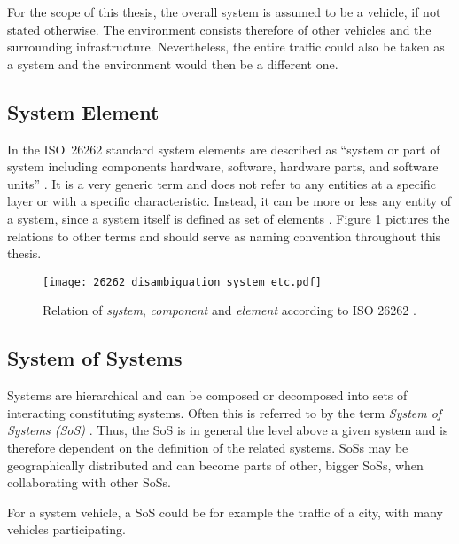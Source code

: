 For the scope of this thesis, the overall system is assumed to be a vehicle, if not stated otherwise. The environment consists therefore of other vehicles and the surrounding infrastructure. Nevertheless, the entire traffic could also be taken as a system and the environment would then be a different one.



\subsection{System Element}
\label{sec:system_element}
In the \mbox{ISO 26262} standard system elements are described as ``system or part of system including components hardware, software, hardware parts, and software units'' \cite{iso26262:1}. It is a very generic term and does not refer to any entities at a specific layer or with a specific characteristic. Instead, it can be more or less any entity of a system, since a system itself is defined as set of elements \cite{iso26262:1}. Figure \ref{fig:26262_disambiguation} pictures the relations to other terms and should serve as naming convention throughout this thesis.

\begin{figure}[!htbp]
\centering
\texttt{[image: 26262\_disambiguation\_system\_etc.pdf]}

\caption{Relation of \emph{system}, \emph{component} and \emph{element} according to ISO 26262 \cite{iso26262:course1}.}
\label{fig:26262_disambiguation}
\end{figure}


\subsection{System of Systems}
Systems are hierarchical and can be composed or decomposed into sets of interacting constituting systems. Often this is referred to by the term \emph{System of Systems (SoS)} \cite[p.7]{genesys}. Thus, the SoS is in general the level above a given system and is therefore dependent on the definition of the related systems. SoSs may be geographically distributed and can become parts of other, bigger SoSs, when collaborating with other SoSs.

For a system vehicle, a SoS could be for example the traffic of a city, with many vehicles participating.


